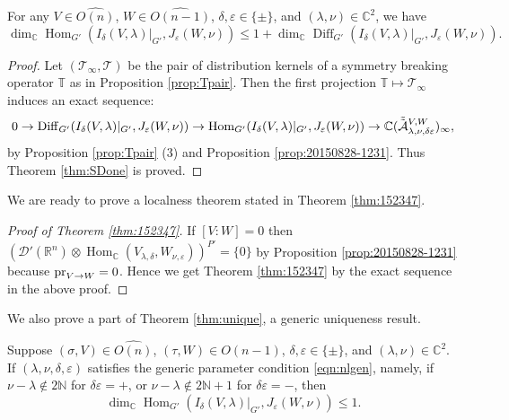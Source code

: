 \begin{theorem}
\label{thm:SDone}
For any $V \in \widehat{O(n)}$,  
 $W \in \widehat{O(n-1)}$, 
 $\delta, \varepsilon \in \{ \pm \}$, 
 and $(\lambda, \nu)\in {\mathbb{C}}^2$, 
 we have
\begin{equation*}
   \dim_{\mathbb{C}}
   \operatorname{Hom}_{G'}
  (
   I_{\delta}(V,\lambda)|_{G'}, J_{\varepsilon}(W,\nu))
   \le 
   1+ 
   \dim_{\mathbb{C}}
  \operatorname{Diff}_{G'}
  (
   I_{\delta}(V,\lambda)|_{G'}, 
   J_{\varepsilon}(W,\nu)).  
\end{equation*}
\end{theorem}
\begin{proof}
Let $({\mathcal{T}}_{\infty},{\mathcal{T}})$ be the pair
 of distribution kernels 
 of a symmetry breaking operator ${\mathbb{T}}$ as in Proposition \ref{prop:Tpair}.  
Then the first projection
 ${\mathbb{T}} \mapsto {\mathcal{T}}_{\infty}$
 induces an exact sequence:
\begin{equation*}
0 \to
 \operatorname{Diff}_{G'}
  (
   I_{\delta}(V, \lambda)|_{G'}, 
   J_{\varepsilon}(W,\nu)
  )
  \to 
 \operatorname{Hom}_{G'}
  (
   I_{\delta}(V, \lambda)|_{G'}, 
   J_{\varepsilon}(W,\nu)
  )
\to 
{\mathbb{C}}(\tilde{\tilde{{\mathcal{A}}}}_{{\lambda},{\nu},{\delta \varepsilon}}^{{V,W}})_{\infty}, 
\end{equation*}
 by Proposition \ref{prop:Tpair} (3)
 and Proposition \ref{prop:20150828-1231}.  
Thus Theorem \ref{thm:SDone} is proved.  
\end{proof}

We are ready to prove a localness theorem 
  stated in Theorem \ref{thm:152347}.  
\begin{proof}
[Proof of Theorem \ref{thm:152347}]
If $[V:W]=0$
 then 
$
   ({\mathcal{D}}'({\mathbb{R}}^n) 
    \otimes 
    \operatorname{Hom}_{\mathbb{C}}(V_{\lambda,\delta}, W_{\nu, \varepsilon}))^{P'}=\{0\}
$
 by Proposition \ref{prop:20150828-1231}
 because $\operatorname{pr}_{{V}\to{W}} =0$.  
Hence we get Theorem \ref{thm:152347}
 by the exact sequence
 in the above proof.  
\end{proof}



We also prove a part of Theorem \ref{thm:unique}, 
 a generic uniqueness result.  
\begin{corollary}
\label{cor:160150upper}
Suppose $(\sigma, V) \in \widehat{O(n)}$, 
 $(\tau, W) \in \widehat{O(n-1)}$, 
 $\delta, \varepsilon \in \{\pm \}$, 
 and $(\lambda,\nu)\in {\mathbb{C}}^2$.  
If $(\lambda, \nu, \delta, \varepsilon)$
 satisfies the generic parameter condition
 \eqref{eqn:nlgen}, 
 namely, 
 if $\nu - \lambda \not \in 2{\mathbb{N}}$
 for $\delta \varepsilon=+$, 
 or $\nu - \lambda \not \in 2{\mathbb{N}}+1$
 for $\delta \varepsilon=-$, 
then 
\[
  \dim_{\mathbb{C}} 
  \operatorname{Hom}_{G'}
  (I_{\delta}(V,\lambda)|_{G'},J_{\varepsilon}(W,\nu))
  \le 1.  
\]
\end{corollary}

